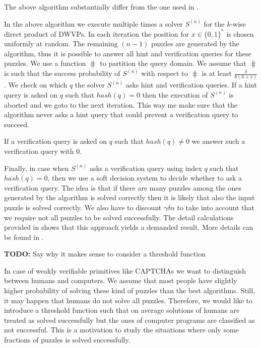 The above algorithm substantially differ from the one used in \cite{canetti2004hardness}.

In the above algorithm we execute multiple times a solver $S^{(n)}$ for the $k$-wise direct product of DWVPs.
In each iteration the position for $x \in \{0,1\}^{*}$ is chosen uniformly at random.
The remaining $(n-1)$ puzzles are generated by the algorithm, thus it is possible to answer
all hint and verification queries for these puzzles.
We use a function $\hash$ to partition the query domain.
We assume that $\hash$ is such that the success probability of $S^{(n)}$ with respect to $\hash$ is at least $\frac{\delta}{8(h+v)}$.
We check on which $q$ the solver $S^{(n)}$ asks hint and verification queries.
If a hint query is asked on $q$ such that $hash(q) = 0$ then the execution of $S^{(n)}$
is aborted and we goto to the next iteration. This way me make sure that the algorithm
never asks a hint query that could prevent a verification query to succeed.

If a verification query is asked on $q$ such that $hash(q) \neq 0$ we answer such a verification
query with $0$.

Finally, in case when $S^{(n)}$ asks a verification query using index $q$ such that $hash(q) = 0$, then
we use a soft decision system to decide whether to ask a verification query.
The idea is that if there are many puzzles among the ones generated by the algorithm is solved correctly
then it is likely that also the input puzzle is solved correctly. We also have to discount
$\gamma\delta n$ to take into account that we require not all puzzles to be solved successfully.
The detail calculations provided in \cite{Dodis:2009:SAI:1530441.1530450} shows that this approach
yields a demanded result. More details can be found in \cite{Dodis:2009:SAI:1530441.1530450, impagliazzo2007chernoff}.

\begin{todo}
  \textbf{TODO:} Say why it makes sense to consider a threshold function\\
\end{todo}
In case of weakly verifiable primitives like CAPTCHAs we want to distinguish between humans and computers.
We assume that most people have slightly higher probability of solving these kind of puzzles than the best algorithms.
Still, it may happen that humans do not solve all puzzles. Therefore, we would like to introduce a threshold function
such that on average solutions of humans are treated as solved successfully but the ones of computer programs are classified
as not successful. This is a motivation to study the situations where only some fractions of puzzles is solved successfully.

